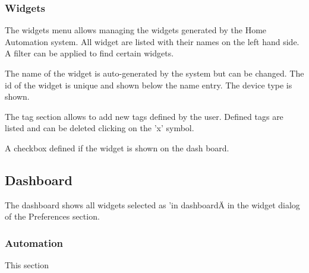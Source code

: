 \subsubsection{Widgets}

The widgets menu allows managing the widgets generated by the 
Home Automation system. All widget are listed with their names on the left hand side.
A filter can be applied to find certain widgets.

The name of the widget is auto-generated by the system but can be changed. The id of the 
widget is unique and shown below the name entry.
The device type is shown.

The tag section allows to add new tags defined by the user. 
Defined tags are listed and can be deleted clicking on the 'x' symbol.

A checkbox defined if the widget is shown on the dash board.

\subsection{Dashboard}

The dashboard shows all widgets selected as 'in dashboardÄ in the widget 
dialog of the Preferences section.

\subsubsection{Automation}

This section


